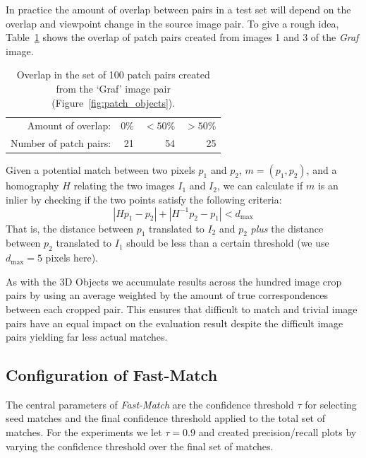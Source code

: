 \documentclass[10pt,twocolumn,letterpaper]{article}
\begin{document}
In practice the amount of overlap between pairs in a test set will 
depend on the overlap and viewpoint change in the source image pair.  To 
give a rough idea, Table~\ref{table:overlap} shows the overlap of patch 
pairs created from images 1 and 3 of the \emph{Graf} image.

\begin{table}[htb]
\caption{Overlap in the set of 100 patch pairs created from the `Graf' image pair (Figure~\ref{fig:patch_objects}).}
\label{table:overlap}
	\centering
\begin{tabular}{r*{3}{r}}
\hline
	Amount of overlap: & 0\% & $< 50$\% & $> 50$\%  \\
	\noalign{\smallskip}
	Number of patch pairs: & 21 & 54 & 25 \\
	\hline
\end{tabular}
\end{table}

Given a potential match between two pixels $p_1$ and 
$p_2$, $m = \left(p_1, p_2\right)$, and a homography $H$ relating the two images $I_1$ and $I_2$, we 
can calculate if $m$ is an inlier by checking if the two points satisfy the following criteria:
\begin{equation*}
\left\vert H p_1 - p_2 \right\vert + \left\vert H^{-1}p_2 - p_1 \right\vert < d_{\max}
\end{equation*}
That is, the distance between $p_1$ translated to $I_2$ and $p_2$ 
\emph{plus} the distance between $p_2$ translated to $I_1$ should be 
less than a certain threshold (we use $d_{\max}=5$ pixels here).

As with the 3D Objects we accumulate results across the hundred image crop pairs by using an average weighted by the amount of true correspondences between each cropped pair. This ensures that difficult to match and trivial image pairs have an equal impact on the evaluation result despite the difficult image pairs yielding far less actual matches.

\subsection{Configuration of Fast-Match}
%
The central parameters of \emph{Fast-Match} are the confidence threshold $\tau$ for selecting seed matches and the final confidence threshold applied to the total set of matches. For the experiments we let $\tau = 0.9$ and created precision/recall plots by varying the confidence threshold over the final set of matches. 
\end{document}
